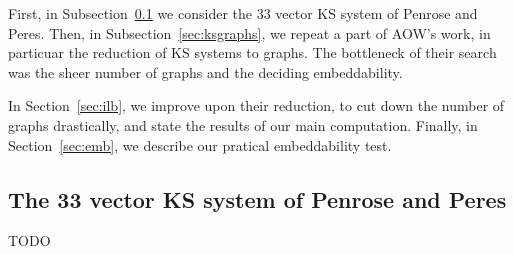 \documentclass[a4paper]{article}
\newcounter{main}
\theoremstyle{definition}
\theoremstyle{remark}
\begin{document}
First, in Subsection~\ref{sec:ks33} we consider the 33 vector KS system
of Penrose and Peres.  Then, in Subsection~\ref{sec:ksgraphs},
we repeat a part of AOW's work, in particuar the reduction of
KS systems to graphs.
The bottleneck of their search was the sheer number of graphs
and the deciding embeddability.

In Section~\ref{sec:ilb},
we improve upon their reduction,
to cut down the number of graphs drastically,
and state the results of our main computation.
Finally, in Section~\ref{sec:emb},
we describe our pratical embeddability test.

\subsection{The 33 vector KS system of Penrose and Peres}
\label{sec:ks33}
TODO
\end{document}

